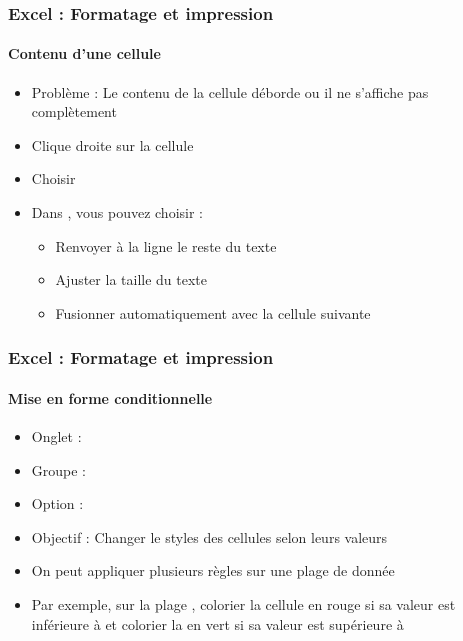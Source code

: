 \documentclass[xcolor=table, usenames,dvipsnames]{beamer}
\begin{document}
\begin{frame}
\frametitle{Excel : Formatage et impression}
\framesubtitle{Contenu d'une cellule}

\begin{minipage}{0.49\textwidth}
	\begin{itemize}
		\item Problème : Le contenu de la cellule déborde ou il ne s'affiche pas complètement
		\item Clique droite sur la cellule
		\item Choisir 
	\end{itemize}
\end{minipage}
%
\begin{minipage}{0.5\textwidth} 
	
	
\end{minipage}

\begin{itemize}
	\item Dans , vous pouvez choisir : 
	\begin{itemize}
		\item Renvoyer à la ligne le reste du texte 
		\item Ajuster la taille du texte 
		\item Fusionner automatiquement avec la cellule suivante
	\end{itemize}
\end{itemize}

\end{frame}

\begin{frame}
\frametitle{Excel : Formatage et impression}
\framesubtitle{Mise en forme conditionnelle}

\begin{minipage}{0.69\textwidth}
	\begin{itemize}
		\item Onglet :  
		\item Groupe :  
		\item Option :  
		\item Objectif : Changer le styles des cellules selon leurs valeurs
		\item On peut appliquer plusieurs règles sur une plage de donnée
		\item Par exemple, sur la plage , colorier la cellule en rouge si sa valeur est inférieure à  et colorier la en vert si sa valeur est supérieure à 
	\end{itemize}
\end{minipage}
%
\begin{minipage}{0.3\textwidth} 
	
	
\end{minipage}

\end{frame}
\end{document}

